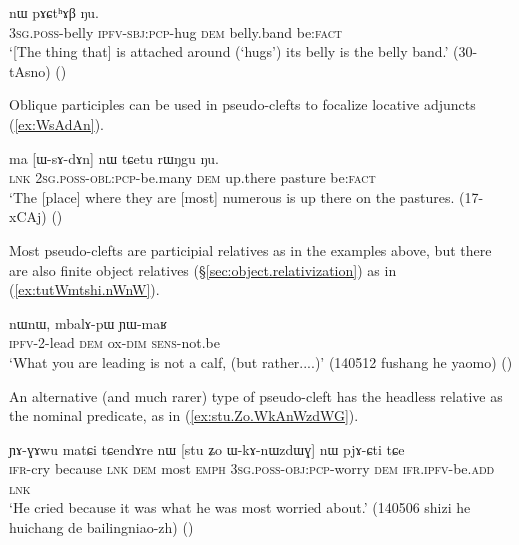 \begin{exe}
\ex \label{ex:tukWrqoR}
 nɯ pɤɕtʰɤβ ŋu. \\
\textsc{3sg}.\textsc{poss}-belly \textsc{ipfv}-\textsc{sbj}:\textsc{pcp}-hug \textsc{dem} belly.band be:\textsc{fact} \\
\glt `[The thing that] is attached around (`hugs') its belly is the belly band.' (30-tAsno)
()
 \end{exe}
 
Oblique participles can be used in pseudo-clefts to focalize locative adjuncts (\ref{ex:WsAdAn}).
 
\begin{exe}
\ex \label{ex:WsAdAn}
\gll  ma [ɯ-sɤ-dɤn] nɯ tɕetu rɯŋgu ŋu. \\
\textsc{lnk} \textsc{2sg}.\textsc{poss}-\textsc{obl}:\textsc{pcp}-be.many \textsc{dem} up.there pasture be:\textsc{fact} \\
\glt `The [place] where they are [most] numerous is up there on the pastures. (17-xCAj)
()
\end{exe}

 Most pseudo-clefts are participial relatives as in the examples above, but there are also finite object relatives (§\ref{sec:object.relativization}) as in (\ref{ex:tutWmtshi.nWnW}).
 
\begin{exe}
\ex \label{ex:tutWmtshi.nWnW}
\gll  [tu-tɯ-mtsʰi] nɯnɯ, mbalɤ-pɯ ɲɯ-maʁ \\
\textsc{ipfv}-2-lead \textsc{dem} ox-\textsc{dim} \textsc{sens}-not.be \\
\glt `What you are leading is not a calf, (but rather....)' (140512 fushang he yaomo)
()
\end{exe}

An alternative (and much rarer) type of pseudo-cleft has the headless relative as the nominal predicate, as in (\ref{ex:stu.Zo.WkAnWzdWG}).

\begin{exe}
\ex \label{ex:stu.Zo.WkAnWzdWG}
\gll ɲɤ-ɣɤwu matɕi tɕendɤre nɯ [stu ʑo ɯ-kɤ-nɯzdɯɣ] nɯ pjɤ-ɕti tɕe  \\
\textsc{ifr}-cry because \textsc{lnk} \textsc{dem} most \textsc{emph} \textsc{3sg}.\textsc{poss}-\textsc{obj}:\textsc{pcp}-worry \textsc{dem} \textsc{ifr}.\textsc{ipfv}-be.\textsc{add} \textsc{lnk} \\
\glt `He cried because it was what he was most worried about.' (140506 shizi he huichang de bailingniao-zh)
()
\end{exe}
 
